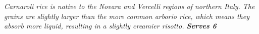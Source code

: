 \documentclass[a4paper]{article}
\begin{document}
\noindent\begin{minipage}[t]{0.1\textwidth} %
                \vspace{0pt}
\end{minipage}\hfill
\begin{minipage}[t][0.9\textheight]{0.8\textwidth}
                \vspace{0pt}
                \noindent\textit{\textcolor{emphasis}{
                                Carnaroli rice is native to the Novara and Vercelli regions of northern Italy. 
                                The grains are slightly larger than the more common arborio rice, which means they absorb more liquid, resulting in a slightly creamier risotto. 
                                \textbf{Serves 6}
                }}


\end{minipage}
\end{document}
